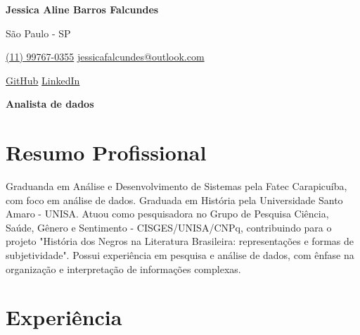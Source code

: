 \documentclass[a4paper,10pt]{article}
\begin{document}

\noindent
\begin{minipage}[t]{0.5\textwidth}
\textbf{\Large Jessica Aline Barros Falcundes}

\vspace{0.4em}

\end{minipage}%
\begin{minipage}[t]{0.5\textwidth}
\raggedleft

São Paulo - SP

{\color{blue}} \href{tel:+5567998748431}{\faPhone \space (11) 99767-0355}
{\color{blue}} \href{mailto:jessicafalcundes@outlook.com}{\faEnvelope \space jessicafalcundes@outlook.com}

\vspace{0.2em}
 \quad
{\color{blue}} \href{https://github.com/jessicafalcundes}{\faGithub \space GitHub} \quad
{\color{blue}} \href{https://www.linkedin.com/in/jessicafalcundes/}{\faLinkedin \space LinkedIn} \\
\end{minipage}

\vspace{1em}

\begin{center}
    \textbf{Analista de dados}
\end{center}
\vspace{0.5em}

\section*{Resumo Profissional}

\vspace{0.6em}

Graduanda em Análise e Desenvolvimento de Sistemas pela Fatec Carapicuíba, com foco em análise de dados. Graduada em História pela Universidade Santo Amaro - UNISA. Atuou como pesquisadora no Grupo de Pesquisa Ciência, Saúde, Gênero e Sentimento - CISGES/UNISA/CNPq, contribuindo para o projeto "História dos Negros na Literatura Brasileira: representações e formas de subjetividade". Possui experiência em pesquisa e análise de dados, com ênfase na organização e interpretação de informações complexas. 

\vspace{0.6em}

\vspace{0.5em}

\section*{Experiência}
\end{document}
